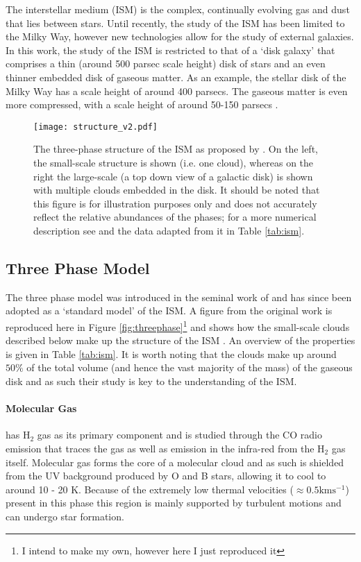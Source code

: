 The interstellar medium (ISM) is the complex, continually evolving gas and dust that lies between stars.
Until recently, the study of the ISM has been limited to the Milky Way, however new technologies allow for the study of external galaxies.
In this work, the study of the ISM is restricted to that of a `disk galaxy' that comprises a thin (around 500 parsec scale height) disk of stars and an even thinner embedded disk of gaseous matter.
As an example, the stellar disk of the Milky Way has a scale height of around 400 parsecs. The gaseous matter is even more compressed, with a scale height of around 50-150 parsecs \citep{drimmel_three-dimensional_2001,kalberla_hi_2009}.

\begin{figure}
    \centering

    \texttt{[image: structure\_v2.pdf]}

    \caption{The three-phase structure of the ISM as proposed by \citet{mckee_theory_1977}.
    On the left, the small-scale structure is shown (i.e. one cloud), whereas on the right the large-scale (a top down view of a galactic disk) is shown with multiple clouds embedded in the disk. 
    It should be noted that this figure is for illustration purposes only and does not accurately reflect the relative abundances of the phases; for a more numerical description see \citet{ferriere_interstellar_2001} and the data adapted from it in Table \ref{tab:ism}.}
    \label{fig:struct}
\end{figure}


\subsection{Three Phase Model}

The three phase model was introduced in the seminal work of \citet{mckee_theory_1977} and has since been adopted as a `standard model' of the ISM. A figure from the original work is reproduced here in Figure \ref{fig:threephase}\footnote{I intend to make my own, however here I just reproduced it} and shows how the small-scale clouds described below make up the structure of the ISM \citep{ferriere_interstellar_2001}. An overview of the properties is given in Table \ref{tab:ism}. It is worth noting that the clouds make up around $50\%$ of the total volume (and hence the vast majority of the mass) of the gaseous disk and as such their study is key to the understanding of the ISM.

\paragraph{Molecular Gas} has H$_2$ gas as its primary component and is studied through the CO radio emission that traces the gas as well as emission in the infra-red from the H$_2$ gas itself. Molecular gas forms the core of a molecular cloud and as such is shielded from the UV background produced by O and B stars, allowing it to cool to around 10 - 20 K. Because of the extremely low thermal velocities ($\approx 0.5 \mathrm{km} \mathrm{s}^{-1}$) present in this phase this region is mainly supported by turbulent motions and can undergo star formation.

